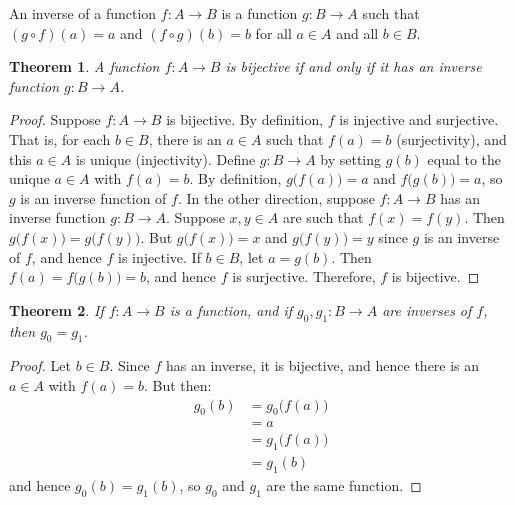 \documentclass{article}
\theoremstyle{plain}
\newtheorem{theorem}{Theorem}[section]
\theoremstyle{normal}
\newenvironment{definition}{%
    \pushQED{\qed}\renewcommand{\qedsymbol}{$\blacksquare$}\definitionx%
}{%
    \popQED\enddefinitionx%
}
\begin{document}
        \begin{definition}[\textbf{Inverse Function}]
            An inverse of a function $f:A\rightarrow{B}$ is a function
            $g:B\rightarrow{A}$ such that $(g\circ{f})(a)=a$ and
            $(f\circ{g})(b)=b$ for all $a\in{A}$ and all $b\in{B}$.
        \end{definition}
        \begin{theorem}
            A function $f:A\rightarrow{B}$ is bijective if and only if it has
            an inverse function $g:B\rightarrow{A}$.
        \end{theorem}
        \begin{proof}
            Suppose $f:A\rightarrow{B}$ is bijective. By definition, $f$ is
            injective and surjective. That is, for each $b\in{B}$, there is
            an $a\in{A}$ such that $f(a)=b$ (surjectivity), and
            this $a\in{A}$ is unique (injectivity). Define $g:B\rightarrow{A}$
            by setting $g(b)$ equal to the unique $a\in{A}$ with
            $f(a)=b$. By definition, $g\big(f(a)\big)=a$ and
            $f\big(g(b)\big)=a$, so $g$ is an inverse function of $f$. In the
            other direction, suppose $f:A\rightarrow{B}$ has an inverse
            function $g:B\rightarrow{A}$. Suppose $x,y\in{A}$ are such
            that $f(x)=f(y)$. Then $g\big(f(x)\big)=g\big(f(y)\big)$.
            But $g\big(f(x)\big)=x$ and $g\big(f(y)\big)=y$ since $g$ is an
            inverse of $f$, and hence $f$ is injective. If $b\in{B}$, let
            $a=g(b)$. Then $f(a)=f\big(g(b)\big)=b$, and hence $f$ is
            surjective. Therefore, $f$ is bijective.
        \end{proof}
        \begin{theorem}
            If $f:A\rightarrow{B}$ is a function, and if
            $g_{0},g_{1}:B\rightarrow{A}$ are inverses of $f$, then
            $g_{0}=g_{1}$.
        \end{theorem}
        \begin{proof}
            Let $b\in{B}$. Since $f$ has an inverse, it is bijective,
            and hence there is an $a\in{A}$ with $f(a)=b$. But then:
            \begin{align}
                g_{0}(b)&=g_{0}\big(f(a)\big)\\
                    &=a\\
                    &=g_{1}\big(f(a)\big)\\
                    &=g_{1}(b)
            \end{align}
            and hence $g_{0}(b)=g_{1}(b)$, so $g_{0}$ and $g_{1}$ are the
            same function.
        \end{proof}
\end{document}
